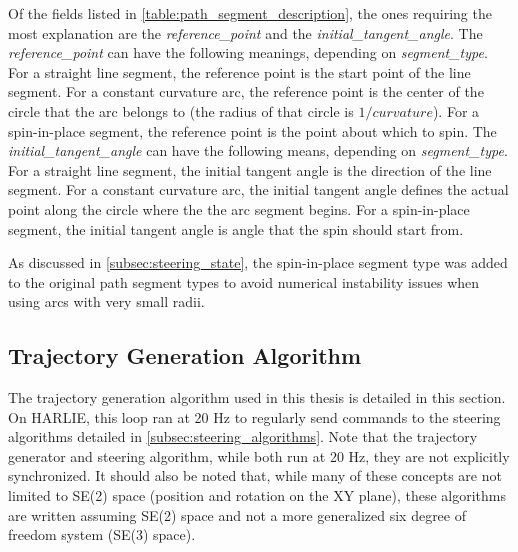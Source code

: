 Of the fields listed in \autoref{table:path_segment_description}, the ones requiring the most explanation are the \emph{reference\_point} and the \emph{initial\_tangent\_angle}. The \emph{reference\_point} can have the following meanings, depending on \emph{segment\_type}. For a straight line segment, the reference point is the start point of the line segment. For a constant curvature arc, the reference point is the center of the circle that the arc belongs to (the radius of that circle is $1/curvature$). For a spin-in-place segment, the reference point is the point about which to spin. The \emph{initial\_tangent\_angle} can have the following means, depending on \emph{segment\_type}. For a straight line segment, the initial tangent angle is the direction of the line segment. For a constant curvature arc, the initial tangent angle defines the actual point along the circle where the the arc segment begins. For a spin-in-place segment, the initial tangent angle is angle that the spin should start from. 

As discussed in \autoref{subsec:steering_state}, the spin-in-place segment type was added to the original path segment types to avoid numerical instability issues when using arcs with very small radii.

\subsection{Trajectory Generation Algorithm}\label{subsec:trajectory_generation_algorithm}

The trajectory generation algorithm used in this thesis is detailed in this section. On HARLIE, this loop ran at 20 Hz to regularly send commands to the steering algorithms detailed in \autoref{subsec:steering_algorithms}. Note that the trajectory generator and steering algorithm, while both run at 20 Hz, they are not explicitly synchronized. It should also be noted that, while many of these concepts are not limited to SE(2) space (position and rotation on the XY plane), these algorithms are written assuming SE(2) space and not a more generalized six degree of freedom system (SE(3) space).


